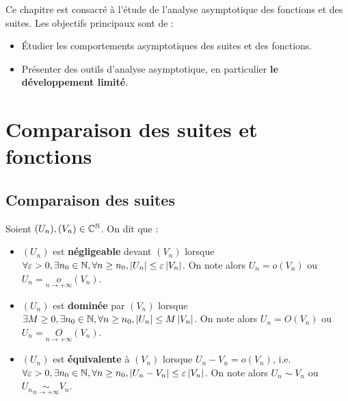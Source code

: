 \documentclass[12pt, a4paper]{report}
\begin{document}

\tableofcontents
\clearpage

\vspace*{\fill}
Ce chapitre est consacré à l'étude de l'analyse asymptotique des fonctions et des suites. Les objectifs principaux sont de :
\begin{itemize}
    \item Étudier les comportements asymptotiques des suites et des fonctions.
    \item Présenter des outils d'analyse asymptotique, en particulier \textbf{le développement limité}.
\end{itemize}
\vspace*{\fill}

\chapter{Comparaison des suites et fonctions}

\section{Comparaison des suites}

\begin{definition}
    Soient $(U_n),(V_n)\in\mathbb{C}^{\mathbb{N}}$. On dit que :
    \begin{itemize}
        \item $(U_n)$ est \textbf{négligeable} devant $(V_n)$ lorsque $\forall \varepsilon > 0, \exists n_0 \in \mathbb{N}, \forall n \ge n_0, \left|U_n\right| \le \varepsilon \left|V_n\right|$. On note alors $U_n = o(V_n)$ ou $U_n = \underset{n\to+\infty}{o}(V_n)$.
        \item $(U_n)$ est \textbf{dominée} par $(V_n)$ lorsque $\exists M \ge 0, \exists n_0 \in \mathbb{N}, \forall n \ge n_0, \left|U_n\right| \le M \left|V_n\right|$. On note alors $U_n = O(V_n)$ ou $U_n = \underset{n\to+\infty}{O}(V_n)$.
        \item $(U_n)$ est \textbf{équivalente} à $(V_n)$ lorsque $U_n-V_n = o(V_n)$, i.e. $\forall \varepsilon > 0, \exists n_0 \in \mathbb{N}, \forall n \ge n_0, \left|U_n-V_n\right| \le \varepsilon \left|V_n\right|$. On note alors $U_n \sim V_n$ ou $U_n \underset{n\to+\infty}{\sim} V_n$.
    \end{itemize}
\end{definition}
\end{document}
